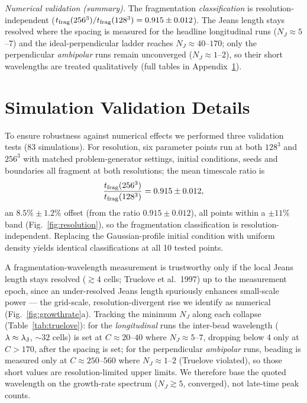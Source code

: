 \documentclass[usenatbib,twoside,twocolumn]{mnras}
\begin{document}
\emph{Numerical validation (summary).} The fragmentation \emph{classification} is resolution-independent ($t_{\rm frag}(256^3)/t_{\rm frag}(128^3)=0.915\pm0.012$). The Jeans length stays resolved where the spacing is measured for the headline longitudinal runs ($N_J\approx5$--$7$) and the ideal-perpendicular ladder reaches $N_J\approx40$--$170$; only the perpendicular \emph{ambipolar} runs remain unconverged ($N_J\approx1$--$2$), so their short wavelengths are treated qualitatively (full tables in Appendix~\ref{sec:validation}).


\section{Simulation Validation Details}
\label{sec:validation}

To ensure robustness against numerical effects we performed three validation tests (83 simulations). For resolution, six parameter points run at both $128^3$ and $256^3$ with matched problem-generator settings, initial conditions, seeds and boundaries all fragment at both resolutions; the mean timescale ratio is
\begin{equation}
\frac{t_{\rm frag}(256^3)}{t_{\rm frag}(128^3)} = 0.915 \pm 0.012,
\end{equation}
an $8.5\%\pm1.2\%$ offset (from the ratio $0.915\pm0.012$), all points within a $\pm11\%$ band (Fig.~\ref{fig:resolution}), so the fragmentation classification is resolution-independent. Replacing the Gaussian-profile initial condition with uniform density yields identical classifications at all 10 tested points.

A fragmentation-wavelength measurement is trustworthy only if the local Jeans length stays resolved ($\gtrsim4$ cells; Truelove et al.\ 1997) up to the measurement epoch, since an under-resolved Jeans length spuriously enhances small-scale power --- the grid-scale, resolution-divergent rise we identify as numerical (Fig.~\ref{fig:growthrate}a). Tracking the minimum $N_J$ along each collapse (Table~\ref{tab:truelove}): for the \emph{longitudinal} runs the inter-bead wavelength ($\lambda\approx\lambda_{\rm J}$, $\sim32$ cells) is set at $C\approx20$--$40$ where $N_J\approx5$--$7$, dropping below 4 only at $C>170$, after the spacing is set; for the perpendicular \emph{ambipolar} runs, beading is measured only at $C\approx250$--$560$ where $N_J\approx1$--$2$ (Truelove violated), so those short values are resolution-limited upper limits. We therefore base the quoted wavelength on the growth-rate spectrum ($N_J\gtrsim5$, converged), not late-time peak counts.
\end{document}
